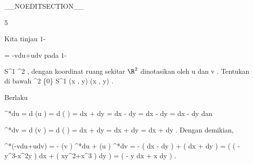 __NOEDITSECTION__

{5}

{

Kita tinjau
$1$-

\mavergleichskettedisp
{\vergleichskette
{ \omega
}
{ =} { -vdu+udv
}
{ } {
}
{ } {
}
{ } {
}
}
{}{}{}
pada
$1$-

\mavergleichskette
{\vergleichskette
{ S^1
}
{ \subset }{ \R^2
}
{  }{
}
{    }{
}
{   }{
}
}
{}{}{,}
dengan koordinat ruang sekitar $\R^2$ dinotasikan oleh
\mathkor {} {u} {dan} {v} {.}
Tentukan
\mathl{\pi^* \omega}{} di bawah
\maabbeledisp {\pi} {\R^2 \setminus \{0\}} { S^{1}
} {(x , y) } { {  } (x , y)
} {.}

}
{

Berlaku

\mavergleichskettealign
{\vergleichskettealign
{ \pi^*du
}
{ =} { d (u \circ \pi)
}
{ =} { d   \left(  {  }  \right)
}
{ =} { {  }   dx + {  } dy
}
{ =} { {  }  dx   - {  }  dy
}
}
{
\vergleichskettefortsetzungalign
{ =} { {  }  dx  - {  }  dy
}
{ =} { {  }  dx  - {  }  dy
}
{ } {}
{ } {}
}
{}{}
dan

\mavergleichskettealign
{\vergleichskettealign
{ \pi^*dv
}
{ =} { d (v \circ \pi)
}
{ =} { d \left(  {  }  \right)
}
{ =} { {  } dx + {  } dy
}
{ =} { {  } dx + {  } dy
}
}
{
\vergleichskettefortsetzungalign
{ =} { {  } dx + {  }  dy
}
{ } {
}
{ } {}
{ } {}
}
{}{.}
Dengan demikian,

\mavergleichskettealigndrucklinks
{\vergleichskettealigndrucklinks
{ \pi^*(-vdu+udv)
}
{ =} { - (v \circ \pi)  \pi^*du + (u \circ \pi) \pi^*dv
}
{ =} { - {  } \left(  {  }  dx  - {  }  dy   \right) + {  }  \left(  {  } dx + {  } dy  \right)
}
{ =} { {  }  \left(  \left(  -y^3-x^2y  \right) dx + \left(  xy^2+x^3  \right) dy \right)
}
{ =} { {  }  \left(  -  y dx + x dy \right)
}
}
{}{}{.}

 }

